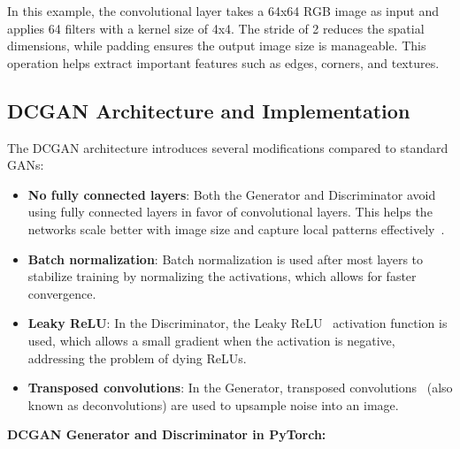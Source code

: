 In this example, the convolutional layer takes a 64x64 RGB image as input and applies 64 filters with a kernel size of 4x4. The stride of 2 reduces the spatial dimensions, while padding ensures the output image size is manageable. This operation helps extract important features such as edges, corners, and textures.

\subsection{DCGAN Architecture and Implementation}
The DCGAN architecture introduces several modifications compared to standard GANs:

\begin{itemize}
    \item \textbf{No fully connected layers}: Both the Generator and Discriminator avoid using fully connected layers in favor of convolutional layers. This helps the networks scale better with image size and capture local patterns effectively~\cite{radford2015unsupervised}.
    \item \textbf{Batch normalization}: Batch normalization is used after most layers to stabilize training by normalizing the activations, which allows for faster convergence.
    \item \textbf{Leaky ReLU}: In the Discriminator, the Leaky ReLU~\cite{dubey2019comparative} activation function is used, which allows a small gradient when the activation is negative, addressing the problem of dying ReLUs.
    \item \textbf{Transposed convolutions}: In the Generator, transposed convolutions~\cite{jansson2012deconvolution} (also known as deconvolutions) are used to upsample noise into an image.
\end{itemize}

\textbf{DCGAN Generator and Discriminator in PyTorch:}

